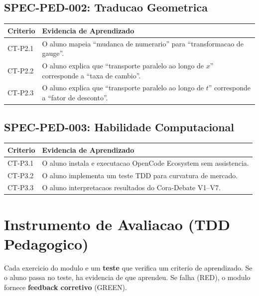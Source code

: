 \subsection{SPEC-PED-002: Traducao Geometrica}

\begin{center}
\begin{tabular}{p{}p{}}
\toprule
\textbf{Criterio} & \textbf{Evidencia de Aprendizado} \\
\midrule
CT-P2.1 & O aluno mapeia ``mudanca de numerario'' para ``transformacao
de gauge''. \\
CT-P2.2 & O aluno explica que ``transporte paralelo ao longo de $x$''
corresponde a ``taxa de cambio''. \\
CT-P2.3 & O aluno explica que ``transporte paralelo ao longo de $t$''
corresponde a ``fator de desconto''. \\
\bottomrule
\end{tabular}
\end{center}

\subsection{SPEC-PED-003: Habilidade Computacional}

\begin{center}
\begin{tabular}{p{}p{}}
\toprule
\textbf{Criterio} & \textbf{Evidencia de Aprendizado} \\
\midrule
CT-P3.1 & O aluno instala e executacao OpenCode Ecosystem sem assistencia. \\
CT-P3.2 & O aluno implementa um teste TDD para curvatura de mercado. \\
CT-P3.3 & O aluno interpretacaos resultados do Cora-Debate V1--V7. \\
\bottomrule
\end{tabular}
\end{center}

\section{Instrumento de Avaliacao (TDD Pedagogico)}

Cada exercicio do modulo e um \textbf{teste} que verifica um criterio
de aprendizado. Se o aluno passa no teste, ha evidencia de que aprendeu.
Se falha (RED), o modulo fornece \textbf{feedback corretivo} (GREEN).


